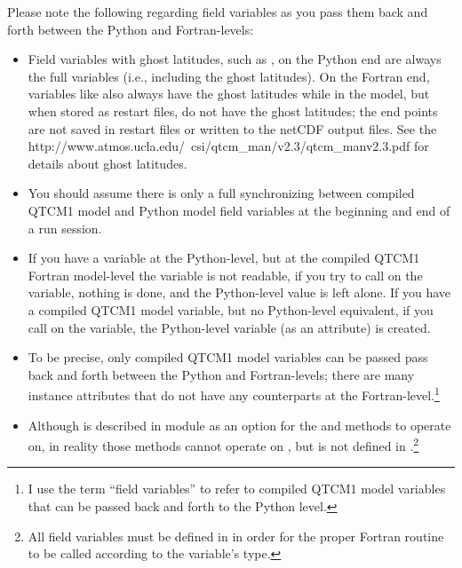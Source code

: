 Please note the following regarding field variables as you pass them 
back and forth between the Python and Fortran-levels:
\begin{itemize}
\item Field variables with ghost latitudes, such as , on
	the Python end are always the full variables (i.e., including
	the ghost latitudes).  On the Fortran end, variables like
	 also always have the ghost latitudes while in the
	model, but when stored as restart files, do not have the
	ghost latitudes; the end points are not saved in restart
	files or written to the netCDF output files.
	See the
{%
        {http://www.atmos.ucla.edu/~csi/qtcm_man/v2.3/qtcm_manv2.3.pdf}}
	\cite{Neelin/etal:2002}
	for details about ghost latitudes.

\item You should assume there is only a full synchronizing between 
	compiled QTCM1 model and Python model field variables
	at the beginning and end of a run session.  

\item If you have a variable at the Python-level, but at the
	compiled QTCM1 Fortran model-level the variable is not
	readable, if you try to call  on the
	variable, nothing is done, and the Python-level value is
	left alone.  If you have a compiled QTCM1 model variable,
	but no Python-level equivalent, if you call 
	on the variable, the Python-level variable (as an attribute)
	is created.

\item To be precise, only compiled QTCM1 model variables can be
	passed pass back and forth between the Python and Fortran-levels;
	there are many  instance attributes that do not
	have any counterparts at the Fortran-level.\footnote%
		{I use the term ``field variables'' to refer to 
		compiled QTCM1 model variables that can be passed
		back and forth to the Python level.}

\item Although  is described in module 
	as an option for the  and
	 methods to operate on, in reality
	those methods cannot operate on , but
	 is not defined in .\footnote%
		{All field variables must be defined in  in
		order for the proper Fortran routine to be called
		according to the variable's type.}
\end{itemize}


